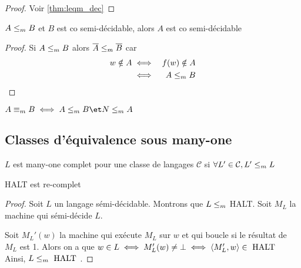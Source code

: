\begin{proof}
	Voir \ref{thm:leqm_dec}
\end{proof}

\begin{theorem}
	$A \leq_m B$ et $B$ est co semi-décidable, alors $A$ est co semi-décidable
\end{theorem}

\begin{proof}
	Si $A \leq_m B$ alors $\overline A \leq_m \overline B$ car
	\begin{eqnarray*}
		w \notin A &\iff& f(w) \notin A \\
		&\iff& A \leq_m B
	\end{eqnarray*}
\end{proof}

\begin{definition}
	$A \equivm B \iff A \leqm B \et N \leqm A$
\end{definition}

\subsection{Classes d'équivalence sous many-one}

\begin{definition}
	$L$ est many-one complet pour une classe de langages $\mathcal C$ si $\forall L' \in \mathcal C, L' \leq_m L$
\end{definition}

\begin{prop}
	HALT est re-complet
\end{prop}

\begin{proof}
	Soit $L$ un langage sémi-décidable. Montrons que $L \leq_m $ HALT. Soit $M_L$ la machine qui sémi-décide $L$.

	Soit $M_L'(w)$ la machine qui exécute $M_L$ sur $w$ et qui boucle si le résultat de $M_L$ est 1. Alors on a que
	$w \in L \iff M_L'(w) \neq \bot \iff \left\langle M_L', w\right\rangle \in \text{ HALT }$
	Ainsi, $L \leq_m \text{ HALT }$.
\end{proof}
